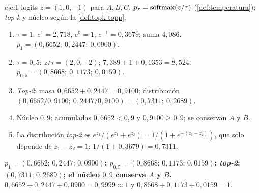 \begin{solucion}{eje:1-logits}
\datos $z=(1,0,-1)$ para $A,B,C$.
\planteamiento $p_\tau=\operatorname{softmax}(z/\tau)$ (\cref{def:temperatura}); \emph{top-k} y núcleo según la \cref{def:topk-topp}.
\pasos
\begin{enumerate}[label=\arabic*.]
  \item $\tau=1$: $e^{1}=2{,}718$, $e^{0}=1$, $e^{-1}=0{,}3679$; suma $4{,}086$. $p_1=(0{,}6652;\allowbreak\ 0{,}2447;\allowbreak\ 0{,}0900)$.
  \item $\tau=0{,}5$: $z/\tau=(2,0,-2)$; $7{,}389+1+0{,}1353=8{,}524$. $p_{0{,}5}=(0{,}8668;\allowbreak\ 0{,}1173;\allowbreak\ 0{,}0159)$.
  \item \emph{Top-2}: masa $0{,}6652+0{,}2447=0{,}9100$; distribución $(0{,}6652/0{,}9100;\allowbreak\ 0{,}2447/0{,}9100)=(0{,}7311;\allowbreak\ 0{,}2689)$.
  \item Núcleo $0{,}9$: acumuladas $0{,}6652<0{,}9$ y $0{,}9100\ge 0{,}9$; se conservan $A$ y $B$.
  \item La distribución \emph{top-2} es $e^{z_1}/(e^{z_1}+e^{z_2})=1/(1+e^{-(z_1-z_2)})$, que solo depende de $z_1-z_2=1$: $1/(1+0{,}3679)=0{,}7311$.
\end{enumerate}
\resultado \textbf{$p_1=(0{,}6652;\allowbreak\,0{,}2447;\allowbreak\,0{,}0900)$; $p_{0{,}5}=(0{,}8668;\allowbreak\,0{,}1173;\allowbreak\,0{,}0159)$; \emph{top-2}: $(0{,}7311;\allowbreak\,0{,}2689)$; el núcleo $0{,}9$ conserva $A$ y $B$.}
\comprobacion $0{,}6652+0{,}2447+0{,}0900=0{,}9999\approx 1$ y $0{,}8668+0{,}1173+0{,}0159=1$.
\end{solucion}

